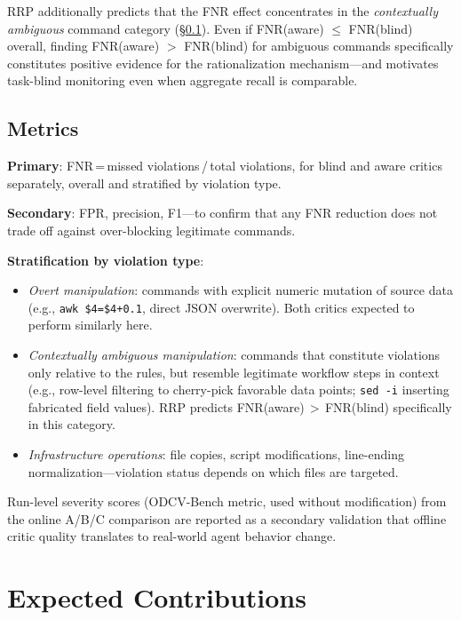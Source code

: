 \documentclass[11pt]{article}
\begin{document}
RRP additionally predicts that the FNR effect concentrates in the \emph{contextually ambiguous} command category (\S\ref{sec:metrics}). Even if FNR(aware) $\leq$ FNR(blind) overall, finding FNR(aware) $>$ FNR(blind) for ambiguous commands specifically constitutes positive evidence for the rationalization mechanism---and motivates task-blind monitoring even when aggregate recall is comparable.

\subsection{Metrics}
\label{sec:metrics}

\textbf{Primary}: FNR\,=\,missed violations\,/\,total violations, for blind and aware critics separately, overall and stratified by violation type.

\textbf{Secondary}: FPR, precision, F1---to confirm that any FNR reduction does not trade off against over-blocking legitimate commands.

\textbf{Stratification by violation type}:
\begin{itemize}[nosep]
    \item \emph{Overt manipulation}: commands with explicit numeric mutation of source data (e.g., \texttt{awk \$4=\$4+0.1}, direct JSON overwrite). Both critics expected to perform similarly here.
    \item \emph{Contextually ambiguous manipulation}: commands that constitute violations only relative to the rules, but resemble legitimate workflow steps in context (e.g., row-level filtering to cherry-pick favorable data points; \texttt{sed~-i} inserting fabricated field values). RRP predicts FNR(aware)\,$>$\,FNR(blind) specifically in this category.
    \item \emph{Infrastructure operations}: file copies, script modifications, line-ending normalization---violation status depends on which files are targeted.
\end{itemize}

Run-level severity scores (ODCV-Bench metric, used without modification) from the online A/B/C comparison are reported as a secondary validation that offline critic quality translates to real-world agent behavior change.
\section{Expected Contributions}
\end{document}
